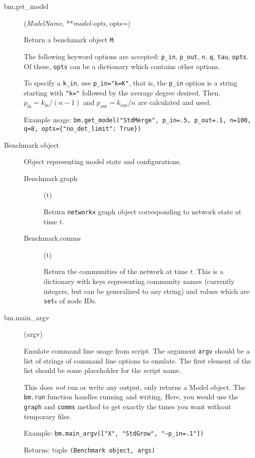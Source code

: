 \documentclass{article}
\def\pin{p_\mathrm{in}}
\def\pout{p_\mathrm{out}}
\def\kin{k_\mathrm{in}}
\def\kout{k_\mathrm{out}}
\def\code#1{\texttt{#1}}
\begin{document}
\begin{description}
\item[bm.get\_model]\hspace{-.15cm}(\textsl{ModelName}, **\textsl{model-opts}, opts={})

  Return a benchmark object \code{M}.

  The following keyword options are accepted: \code{p\_in}, \code{p\_out},
  \code{n}, \code{q}, \code{tau}, \code{opts}.  Of these, \code{opts}
  can be a dictionary which contains other options.

  To specify a \code{k\_in}, use \code{p\_in="k=K"}, that is, the
  \code{p\_in} option is a string starting with \code{"k="} followed
  by the average degree desired.  Then, $\pin=\kin/(n-1)$ and
  $\pout=\kout/n$ are calculated and used.

  Example usage: \code{bm.get\_model("StdMerge", p\_in=.5, p\_out=.1,
    n=100, q=8, opts=\{"no\_det\_limit": True\})}

\item[Benchmark object] Object representing model state and
  configurations.

  \begin{description}
  \item [Benchmark.graph]\hspace{-.15cm}(t)

    Return \code{networkx} graph object corresponding to network state
    at time $t$.

  \item [Benchmark.comms]\hspace{-.15cm}(t)

    Return the communities of the network at time $t$.  This is a
    dictionary with keys representing community names (currently integers, but
    can be generalized to any string) and values which are
    \texttt{set}s of node IDs.
  \end{description}


\item[bm.main\_argv]\hspace{-.15cm}(argv)

  Emulate command line usage from script.  The argument \texttt{argv}
  should be a list of strings of command line options to emulate.  The
  first element of the list should be some placeholder for the script name.

  This does \textsl{not} run or write any output, only returns a Model
  object.  The \code{bm.run} function handles running and writing.
  Here, you would use the \code{graph} and \code{comms} method to get
  exactly the times you want without temporary files.

  Example: \code{bm.main\_argv(["X", "StdGrow", "--p\_in=.1"])}

  Returns: tuple \texttt{(Benchmark \textrm{object}, args)}

\end{description}
\end{document}
